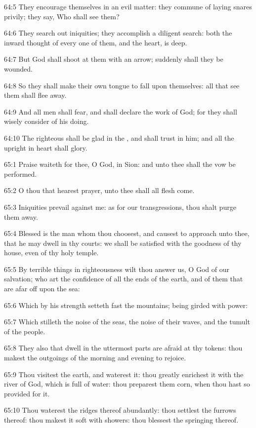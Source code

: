 64:5 They encourage themselves in an evil matter: they commune of
laying snares privily; they say, Who shall see them?

64:6 They search out iniquities; they accomplish a diligent search:
both the inward thought of every one of them, and the heart, is deep.

64:7 But God shall shoot at them with an arrow; suddenly shall they be
wounded.

64:8 So they shall make their own tongue to fall upon themselves: all
that see them shall flee away.

64:9 And all men shall fear, and shall declare the work of God; for
they shall wisely consider of his doing.

64:10 The righteous shall be glad in the \LORD, and shall trust in him;
and all the upright in heart shall glory.



65:1 Praise waiteth for thee, O God, in Sion: and unto thee shall the
vow be performed.

65:2 O thou that hearest prayer, unto thee shall all flesh come.

65:3 Iniquities prevail against me: as for our transgressions, thou
shalt purge them away.

65:4 Blessed is the man whom thou choosest, and causest to approach
unto thee, that he may dwell in thy courts: we shall be satisfied with
the goodness of thy house, even of thy holy temple.

65:5 By terrible things in righteousness wilt thou answer us, O God of
our salvation; who art the confidence of all the ends of the earth,
and of them that are afar off upon the sea:

65:6 Which by his strength setteth fast the mountains; being girded
with power:

65:7 Which stilleth the noise of the seas, the noise of their waves,
and the tumult of the people.

65:8 They also that dwell in the uttermost parts are afraid at thy
tokens: thou makest the outgoings of the morning and evening to
rejoice.

65:9 Thou visitest the earth, and waterest it: thou greatly enrichest
it with the river of God, which is full of water: thou preparest them
corn, when thou hast so provided for it.

65:10 Thou waterest the ridges thereof abundantly: thou settlest the
furrows thereof: thou makest it soft with showers: thou blessest the
springing thereof.


